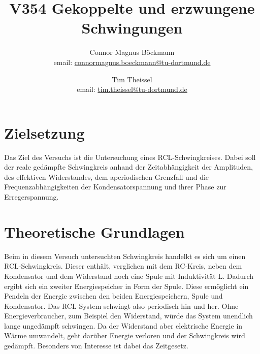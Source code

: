 \documentclass[titlepage=firstcover, captions=tableheading]{scrartcl}
\title{V354 Gekoppelte und erzwungene Schwingungen}
\author{
Connor Magnus Böckmann \\ email: \href{mailto:connormagnus.boeckmann@tu-dortmund.de}{connormagnus.boeckmann@tu-dortmund.de}
\and Tim Theissel \\ email: \href{mailto:tim.theissel@tu-dortmund.de}{tim.theissel@tu-dortmund.de}}
\begin{document}
\maketitle
\newpage
\tableofcontents
\newpage
\section{Zielsetzung}
Das Ziel des Versuchs ist die Untersuchung eines RCL-Schwingkreises. Dabei soll der reale gedämpfte Schwingkreis anhand der Zeitabhängigkeit der Amplituden, des effektiven Widerstandes, dem aperiodischen Grenzfall und die Frequenzabhängigkeiten der Kondensatorspannung und ihrer Phase zur Erregerspannung. 
\section{Theoretische Grundlagen}
Beim in diesem Versuch untersuchten Schwingkreis handelkt es sich um einen RCL-Schwingkreis. Dieser enthält, verglichen mit dem RC-Kreis, neben dem Kondensator und dem Widerstand noch eine Spule mit Induktivität L. Dadurch ergibt sich ein zweiter Energiespeicher in Form der Spule. Diese ermöglicht ein Pendeln der Energie zwischen den beiden Energiespeichern, Spule und Kondensator. Das RCL-System schwingt also periodisch hin und her. Ohne Energieverbraucher, zum Beispiel den Widerstand, würde das System unendlich lange ungedämpft schwingen. Da der Widerstand aber elektrische Energie in Wärme umwandelt, geht darüber Energie verloren und der Schwingkreis wird gedämpft. Besonders von Interesse ist dabei das Zeitgesetz.
\end{document}
